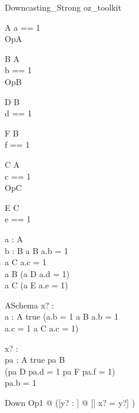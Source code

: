 \begin{zsection}
  \SECTION Downcasting\_Strong \parents oz\_toolkit
\end{zsection}

\begin{class}{A}
 a == 1\\
 OpA 
\end{class}

\begin{class}{B}
 A\\
 b == 1\\
 OpB \sdef [x? : \nat]
\end{class}

\begin{class}{D}
 B\\
 d == 1
\end{class}

\begin{class}{F}
 B\\
 f == 1
\end{class}


\begin{class}{C}
 A\\
 c == 1\\
 OpC \sdef [x? : \nat]
\end{class}

\begin{class}{E}
  C\\
  e == 1
\end{class}

\begin{axdef}
  a : \poly A\\
  b : B
\where
  a \in B \implies a.b = 1\\
  a \in C \implies a.c = 1\\
  a \in \poly B \implies (a \in D \implies a.d = 1)\\
  a \in \poly C \implies (a \in E \implies a.e = 1)\\
\end{axdef}

\begin{schema}{ASchema}
  x? : \nat\\
  a : \poly A
\where
  true \land
  (a.b = 1 \land a \in B \land a.b = 1 \lor\\
   a.c = 1 \land a \in C \land a.c = 1)
\end{schema}

\begin{axdef}
  x? : \nat\\
  pa : \poly A
\where
  true \land pa \in \poly B\\
  (pa \in D \land pa.d = 1 \lor pa \in F \land pa.f = 1) \\
  pa.b = 1
\end{axdef}

\begin{class}{Down}
 Op1 \sdef [x? : \nat] @ ([y? : \nat] @ [| x? = y?] )
\end{class}
